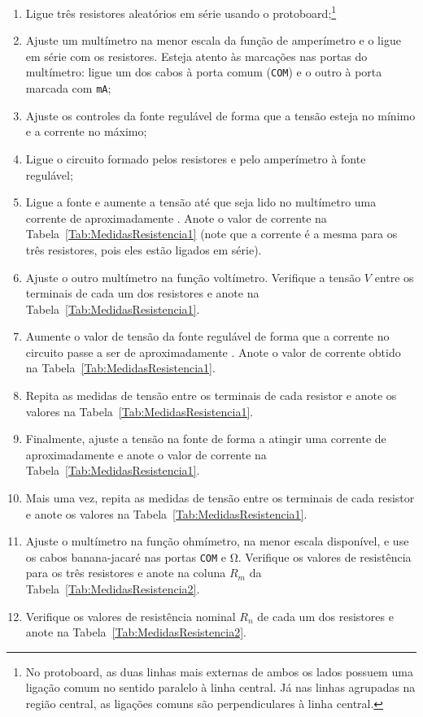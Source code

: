 \begin{enumerate}
    \item Ligue três resistores aleatórios em série usando o protoboard;\footnote{No protoboard, as duas linhas mais externas de ambos os lados possuem uma ligação comum no sentido paralelo à linha central. Já nas linhas agrupadas na região central, as ligações comuns são perpendiculares à linha central.}
    \item Ajuste um multímetro na menor escala da função de amperímetro e o ligue em série com os resistores. Esteja atento às marcações nas portas do multímetro: ligue um dos cabos à porta comum (\texttt{COM}) e o outro à porta marcada com \texttt{mA};
    \item Ajuste os controles da fonte regulável de forma que a tensão esteja no mínimo e a corrente no máximo;
    \item Ligue o circuito formado pelos resistores e pelo amperímetro à fonte regulável;
    \item Ligue a fonte e aumente a tensão até que seja lido no multímetro uma corrente de aproximadamente . Anote o valor de corrente na Tabela~\ref{Tab:MedidasResistencia1} (note que a corrente é a mesma para os três resistores, pois eles estão ligados em série).
    \item Ajuste o outro multímetro na função voltímetro. Verifique a tensão $V$ entre os terminais de cada um dos resistores e anote na Tabela~\ref{Tab:MedidasResistencia1}.
    \item Aumente o valor de tensão da fonte regulável de forma que  a corrente no circuito passe a ser de aproximadamente . Anote o valor de corrente obtido na Tabela~\ref{Tab:MedidasResistencia1}.
    \item Repita as medidas de tensão entre os terminais de cada resistor e anote os valores na Tabela~\ref{Tab:MedidasResistencia1}.
    \item Finalmente, ajuste a tensão na fonte de forma a atingir uma corrente de aproximadamente  e anote o valor de corrente na Tabela~\ref{Tab:MedidasResistencia1}.
    \item Mais uma vez, repita as medidas de tensão entre os terminais de cada resistor e anote os valores na Tabela~\ref{Tab:MedidasResistencia1}.
    \item Ajuste o multímetro na função ohmímetro, na menor escala disponível, e use os cabos banana-jacaré nas portas \texttt{COM} e \si{\ohm}. Verifique os valores de resistência para os três resistores e anote na coluna $R_m$ da Tabela~\ref{Tab:MedidasResistencia2}.
    \item Verifique os valores de resistência nominal $R_n$ de cada um dos resistores e anote na Tabela~\ref{Tab:MedidasResistencia2}.
\end{enumerate}

